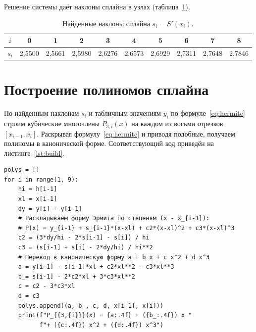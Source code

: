 \documentclass[a4paper, final]{article}
\begin{document}
Решение системы даёт наклоны сплайна в узлах (таблица~\ref{tab:slopes}).

\begin{table}[h!]
\centering
\begin{tabular}{|c|c|c|c|c|c|c|c|c|c|}
\hline
$i$   & 0 & 1 & 2 & 3 & 4 & 5 & 6 & 7 & 8 \\
\hline
$s_i$ & 2,5500 & 2,5661 & 2,5980 & 2,6276 & 2,6573 & 2,6929 & 2,7311 & 2,7648 & 2,7846 \\
\hline
\end{tabular}
\caption{Найденные наклоны сплайна $s_i = S'(x_i)$.}
\label{tab:slopes}
\end{table}

\newpage

\section{Построение полиномов сплайна}

По найденным наклонам $s_i$ и табличным значениям $y_i$ по
формуле~\eqref{eq:hermite} строим кубические многочлены $P_{3,i}(x)$ на каждом
из восьми отрезков $[x_{i-1}, x_i]$. Раскрывая формулу~\eqref{eq:hermite} и
приводя подобные, получаем полиномы в канонической форме. Соответствующий код
приведён на листинге~\ref{lst:build}.

\begin{lstlisting}[caption={Вычисление коэффициентов полиномов сплайна}, label=lst:build]
polys = []
for i in range(1, 9):
    hi = h[i-1]
    xl = x[i-1]
    dy = y[i] - y[i-1]
    # Раскладываем форму Эрмита по степеням (x - x_{i-1}):
    # P(x) = y_{i-1} + s_{i-1}*(x-xl) + c2*(x-xl)^2 + c3*(x-xl)^3
    c2 = (3*dy/hi - 2*s[i-1] - s[i]) / hi
    c3 = (s[i-1] + s[i] - 2*dy/hi) / hi**2
    # Перевод в каноническую форму a + b x + c x^2 + d x^3
    a = y[i-1] - s[i-1]*xl + c2*xl**2 - c3*xl**3
    b_= s[i-1] - 2*c2*xl + 3*c3*xl**2
    c = c2 - 3*c3*xl
    d = c3
    polys.append((a, b_, c, d, x[i-1], x[i]))
    print(f"P_{{3,{i}}}(x) = {a:.4f} + ({b_:.4f}) x "
          f"+ ({c:.4f}) x^2 + ({d:.4f}) x^3")
\end{lstlisting}
\end{document}
